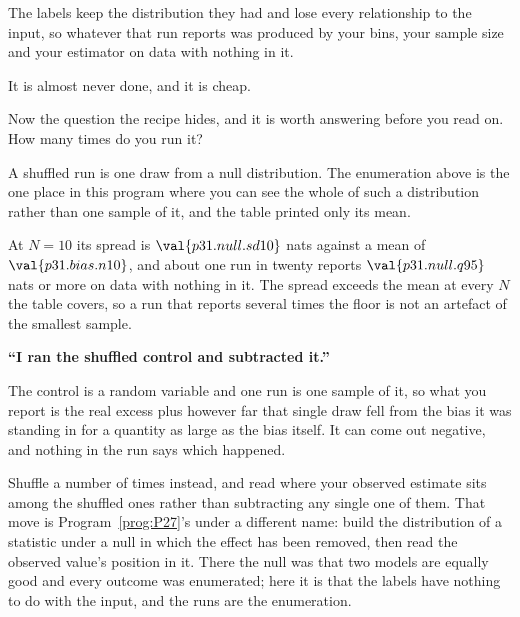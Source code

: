 \begin{fr}

The labels keep the distribution they had and lose every relationship to the
input, so whatever that run reports was produced by your bins, your sample
size and your estimator on data with nothing in it.

It is almost never done, and it is cheap.

Now the question the recipe hides, and it is worth answering before you read
on. How many times do you run it?
\dotline
\nextframe
\end{fr}

\begin{fr}

A shuffled run is one draw from a null distribution. The enumeration above
is the one place in this program where you can see the whole of such a
distribution rather than one sample of it, and the table printed only its
mean.

At $N = 10$ its spread is $\val{p31.null.sd10}$ nats against a mean of
$\val{p31.bias.n10}$, and about one run in twenty reports
$\val{p31.null.q95}$ nats or more \dash{} on data with nothing in it. The
spread exceeds the mean at every $N$ the table covers, so a run that reports
several times the floor is not an artefact of the smallest sample.

\begin{trapbox}
\textbf{\enquote{I ran the shuffled control and subtracted it.}}

The control is a random variable and one run is one sample of it, so what
you report is the real excess plus however far that single draw fell from
the bias it was standing in for \dash{} a quantity as large as the bias
itself. It can come out negative, and nothing in the run says which
happened.

Shuffle a number of times instead, and read where your observed estimate
sits among the shuffled ones rather than subtracting any single one of them.
That move is Program~\ref{prog:P27}'s under a different name: build the
distribution of a statistic under a null in which the effect has been
removed, then read the observed value's position in it. There the null was
that two models are equally good and every outcome was enumerated; here it
is that the labels have nothing to do with the input, and the runs are the
enumeration.
\end{trapbox}

\end{fr}

